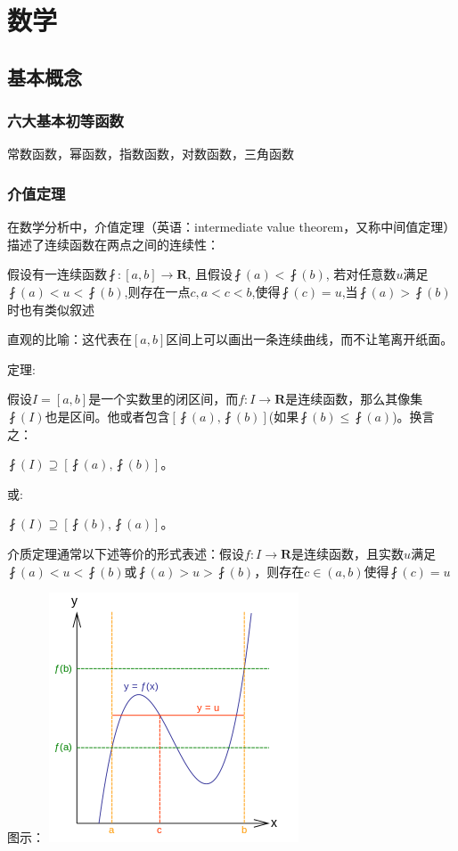 \documentclass[UTF8]{ctexbook}
\begin{document}
\chapter{数学}{
\section{基本概念}{
\subsection{六大基本初等函数}{
  常数函数，幂函数，指数函数，对数函数，三角函数
}%

\subsection{介值定理}{
在数学分析中，介值定理（英语：intermediate value theorem，又称中间值定理）描述了连续函数在两点之间的连续性：

假设有一连续函数$\fint:[a,b]\rightarrow \mathbf{R}$, 且假设$\fint(a)<\fint(b)$, 若对任意数$u$满足$\fint(a)<u<\fint(b)$,则存在一点$c,a<c<b$,使得$\fint(c) = u$,当$\fint(a)>\fint(b)$时也有类似叙述

直观的比喻：这代表在$[a,b]$区间上可以画出一条连续曲线，而不让笔离开纸面。
\newline

定理:

假设$I = [a,b]$是一个实数里的闭区间，而$f:I\rightarrow\mathbf{R}$是连续函数，那么其像集$\fint(I)$也是区间。他或者包含$[\fint(a),\fint(b)]$(如果$\fint(b)\leq\fint(a)$)。换言之：

$\fint(I)\supseteq[\fint(a),\fint(b)]$。

或:

$\fint(I)\supseteq[\fint(b), \fint(a)]$。

介质定理通常以下述等价的形式表述：假设$f:I\rightarrow\mathbf{R}$是连续函数，且实数$u$满足$\fint(a)<u<\fint(b)$或$\fint(a)>u>\fint(b)$，则存在$c\in(a,b)$使得$\fint(c) = u$

图示：
\includegraphics{resources/Intermediatevaluetheorem.png}
}%

}}
\end{document}
